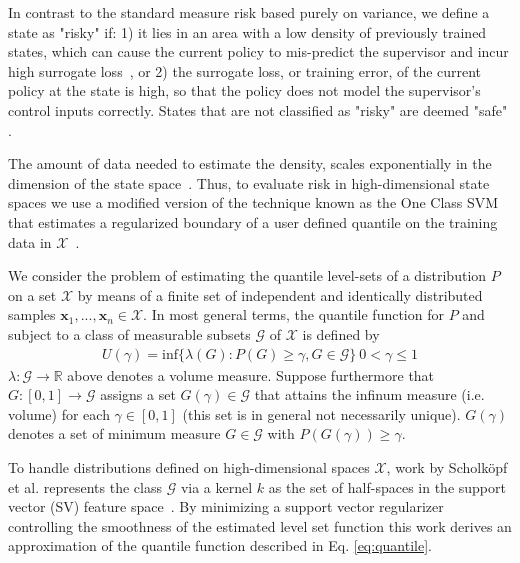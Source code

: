 \documentclass[10pt, conference]{ieeeconf}      %
\newcommand{\fpnote}[1]{\ifthenelse{ \boolean{include-notes}}%
 {\textcolor{blue}{\textbf{FP: #1}}}{}}
\begin{document}
In contrast to the standard measure risk based purely on variance, we define a state as "risky"  if: 1) it lies in an area with a low density of
previously trained states, which can cause the current policy to mis-predict the supervisor and incur high surrogate
loss~\cite{tokdar2010importance}, or 2) the surrogate loss, or training error, of the current policy at the state  is high, so that the policy does not  model the supervisor's control inputs correctly. States that are not classified as "risky" are deemed "safe" .

The amount of data needed to estimate the density, scales exponentially in the dimension of the state space~\cite{liu2007sparse}. 
Thus, to evaluate risk in high-dimensional state spaces we use
a modified version of the technique known as the One Class SVM that estimates a regularized boundary of a user defined quantile on the training data in $\mathcal{X}$~\cite{scholkopf2001estimating}.



We consider the problem of estimating the quantile level-sets of a distribution $P$ on a set $\mathcal{X}$ by means of a finite set of
independent and identically distributed samples $\mathbf{x}_1,...,\mathbf{x}_n\in \mathcal{X}$.
In most general terms, the quantile function for $P$ and subject to a class of measurable subsets $\mathcal{G}$ of $\mathcal{X}$ is
defined by
\vspace{-2ex}
\begin{align}\label{eq:quantile}
U(\gamma) = \mbox{inf} \lbrace \lambda(G):P(G) \geq \gamma, G \in \mathcal{G} \rbrace \: 0<\gamma \leq 1
\end{align} 
$\lambda:\mathcal{G}\to \mathbb{R}$ above denotes a volume measure.
Suppose furthermore that $G:[0,1]\to \mathcal{G}$ assigns a set $G(\gamma) \in \mathcal{G}$ that attains the infinum
measure (i.e. volume) for each $\gamma\in [0,1]$ (this set is in general not necessarily unique). 
$G(\gamma)$ denotes a set of minimum measure $G \in \mathcal{G}$ with $P(G(\gamma))\ge \gamma$.

To handle distributions defined on high-dimensional spaces $\mathcal{X}$, work by Scholk{\"o}pf et al. represents the class $\mathcal{G}$ via a kernel $k$ as the set of half-spaces in the support vector (SV) feature space~\cite{scholkopf2001estimating}. 
By minimizing a support vector regularizer controlling the smoothness of the estimated level set function this work
derives an approximation of the quantile function described in Eq. \ref{eq:quantile}.
\end{document}
